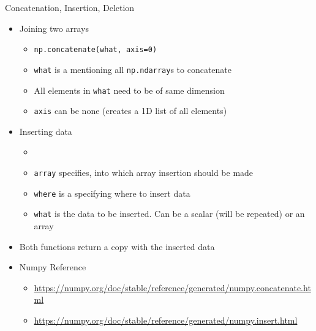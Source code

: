 
\begin{frame}[fragile]{Concatenation, Insertion, Deletion}
%
\begin{itemize}
\item Joining two arrays
	\begin{itemize}
	\item \texttt{np.concatenate(what, axis=0)}
	\item \texttt{what} is a  mentioning all \texttt{np.ndarray}s to concatenate
	\item All elements in \texttt{what} need to be of same dimension
	\item \texttt{axis} can be none (creates a 1D list of all elements)
	\end{itemize}
\item Inserting data
	\begin{itemize}
	\item {}
	\item \texttt{array} specifies, into which array insertion should be made
	\item \texttt{where} is a  specifying where to insert data
	\item \texttt{what} is the data to be inserted. Can be a scalar (will be repeated) or an array
	\end{itemize}
\item Both functions return a copy with the inserted data
\item Numpy Reference
	\begin{itemize}
	\item \scriptsize \url{https://numpy.org/doc/stable/reference/generated/numpy.concatenate.html}
	\item \scriptsize \url{https://numpy.org/doc/stable/reference/generated/numpy.insert.html}
	\end{itemize}
\end{itemize}
%
\end{frame}


